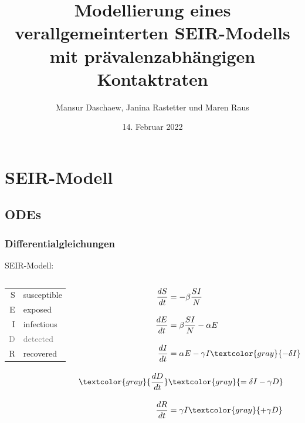 \documentclass{beamer}
\title{Modellierung eines verallgemeinterten SEIR-Modells mit prävalenzabhängigen Kontaktraten}
\date{14. Februar 2022} %
\author{Mansur Daschaew, Janina Rastetter und Maren Raus}
\begin{document}
\maketitle

\tableofcontents

\section{SEIR-Modell}

\subsection{ODEs}
\begin{frame}
	\frametitle{Differentialgleichungen}
SEIR-Modell:
\begin{columns}
\begin{column}{0.2\textwidth}
	\begin{tabular}{rl}
	S & susceptible \\
	E & exposed \\
	I & infectious \\
	\textcolor{gray}{D} & \textcolor{gray}{detected} \\
	R & recovered \\
	\end{tabular}
\end{column}
\begin{column}{0.2\textwidth} 

		\begin{align*}
		\frac{dS}{dt} &= -\beta \frac{SI}{N} \\[10pt]
		\frac{dE}{dt} &= \beta \frac{SI}{N} - \alpha E \\[10pt]
		\frac{dI}{dt} &= \alpha E - \gamma I \textcolor{gray}{ - \delta I} \\[10pt]
		\textcolor{gray}{\frac{dD}{dt}} &\textcolor{gray}{= \delta I - \gamma D} \\[10pt]
		\frac{dR}{dt} &= \gamma I \textcolor{gray}{+ \gamma D }
		\end{align*}
\end{column}
\end{columns}

\end{frame}
\end{document}
